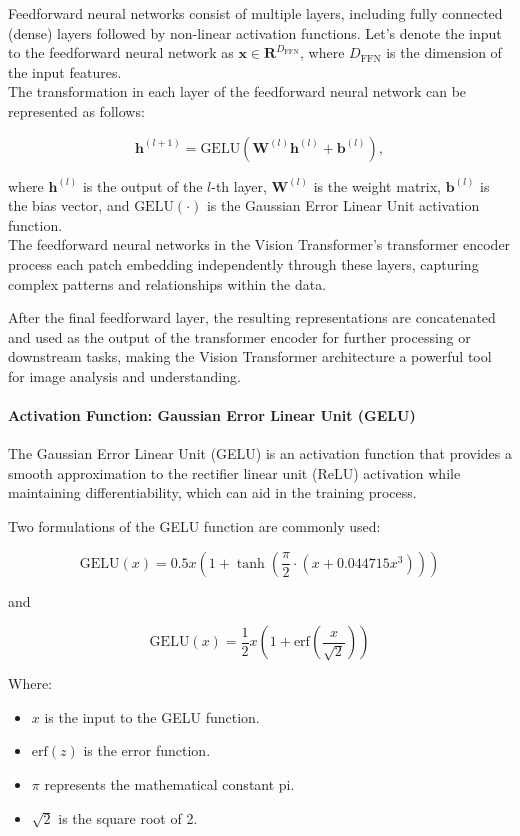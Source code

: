 \noindent Feedforward neural networks consist of multiple layers, including fully connected (dense) layers followed by non-linear activation functions. Let's denote the input to the feedforward neural network as $\mathbf{x} \in \mathbf{R}^{D_{\text{FFN}}}$, where $D_{\text{FFN}}$ is the dimension of the input features.
\\

\noindent The transformation in each layer of the feedforward neural network can be represented as follows:

\[
    \mathbf{h}^{(l+1)} = \text{GELU}\left(\mathbf{W}^{(l)} \mathbf{h}^{(l)} + \mathbf{b}^{(l)}\right),
\]

where $\mathbf{h}^{(l)}$ is the output of the $l$-th layer, $\mathbf{W}^{(l)}$ is the weight matrix, $\mathbf{b}^{(l)}$ is the bias vector, and $\text{GELU}(\cdot)$ is the Gaussian Error Linear Unit activation function.
\\

\noindent The feedforward neural networks in the Vision Transformer's transformer encoder process each patch embedding independently through these layers, capturing complex patterns and relationships within the data.

\noindent After the final feedforward layer, the resulting representations are concatenated and used as the output of the transformer encoder for further processing or downstream tasks, making the Vision Transformer architecture a powerful tool for image analysis and understanding.

\paragraph{Activation Function: Gaussian Error Linear Unit (GELU)}
The Gaussian Error Linear Unit (GELU) is an activation function that provides a smooth approximation to the rectifier linear unit (ReLU) activation while maintaining differentiability, which can aid in the training process.

\noindent Two formulations of the GELU function are commonly used:

\[
    \text{GELU}(x) = 0.5x \left(1 + \tanh\left(\frac{\pi}{2} \cdot \left(x + 0.044715x^3\right)\right)\right)
\]

and

\[
    \text{GELU}(x) = \frac{1}{2}x \left(1 + \text{erf}\left(\frac{x}{\sqrt{2}}\right)\right)
\]

Where:
\begin{itemize}
    \item $x$ is the input to the GELU function.
    \item $\text{erf}(z)$ is the error function.
    \item $\pi$ represents the mathematical constant pi.
    \item $\sqrt{2}$ is the square root of 2.
\end{itemize}

